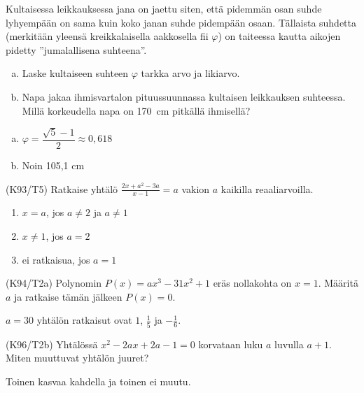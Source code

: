 \begin{tehtava}
    Kultaisessa leikkauksessa jana on jaettu siten, että pidemmän osan suhde lyhyempään on sama kuin koko janan suhde pidempään osaan. Tällaista suhdetta (merkitään yleensä kreikkalaisella aakkosella fii $\varphi$) on taiteessa kautta aikojen pidetty ''jumalallisena suhteena''.
		\begin{enumerate}[a)]
            \item Laske kultaiseen suhteen $\varphi$ tarkka arvo ja likiarvo.
            \item Napa jakaa ihmisvartalon pituussuunnassa kultaisen leikkauksen suhteessa. Millä korkeudella napa on 170~cm pitkällä ihmisellä?
        \end{enumerate}
    \begin{vastaus}
        \begin{enumerate}[a)]
            \item $ \varphi = \dfrac{\sqrt{5}-1}{2} \approx 0,618$
            \item Noin 105,1 cm
        \end{enumerate}
    \end{vastaus}
\end{tehtava}
\begin{tehtava}
(K93/T5) Ratkaise yhtälö 
        $\frac{2x+a^2-3a}{x-1}=a$ vakion $a$ kaikilla reaaliarvoilla.
\begin{vastaus}
        \begin{enumerate}
         \item{$x=a$, jos $a \neq 2$ ja $a \neq 1$} 
         \item{$x\neq 1$, jos $a=2$}
         \item{ei ratkaisua, jos $a=1$}
        \end{enumerate}
    \end{vastaus}
\end{tehtava}
\begin{tehtava}
(K94/T2a) Polynomin $P(x)=ax^3-31x^2+1$ eräs nollakohta on $x=1$. Määritä $a$ ja ratkaise tämän jälkeen $P(x)=0$.
\begin{vastaus}
      $a=30$ yhtälön ratkaisut ovat $1$, $\frac{1}{5}$ ja $-\frac{1}{6}$.
    \end{vastaus}
\end{tehtava}
\begin{tehtava}
(K96/T2b) Yhtälössä $x^2-2ax+2a-1=0$ korvataan luku $a$ luvulla $a+1$. Miten muuttuvat yhtälön juuret?
\begin{vastaus}
     Toinen kasvaa kahdella ja toinen ei muutu.
    \end{vastaus}
\end{tehtava}

